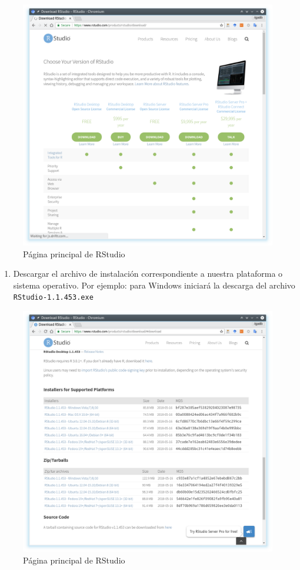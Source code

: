 \documentclass[a4paper]{book}
\providecommand{\tightlist}{%
  \setlength{\itemsep}{0pt}\setlength{\parskip}{0pt}}
\begin{document}
\begin{figure}[h]

{\centering \includegraphics[width=0.75\linewidth,]{images/rstudio_download} 

}

\caption{Página principal de RStudio}\label{fig:unnamed-chunk-8}
\end{figure}

\begin{enumerate}
\def\labelenumi{\arabic{enumi})}
\setcounter{enumi}{1}
\tightlist
\item
  Descargar el archivo de instalación correspondiente a nuestra
  plataforma o sistema operativo. Por ejemplo: para Windows iniciará la
  descarga del archivo \texttt{RStudio-1.1.453.exe}
\end{enumerate}

\begin{figure}[h]

{\centering \includegraphics[width=0.75\linewidth,]{images/rstudio_download_OS} 

}

\caption{Página principal de RStudio}\label{fig:unnamed-chunk-9}
\end{figure}
\end{document}
